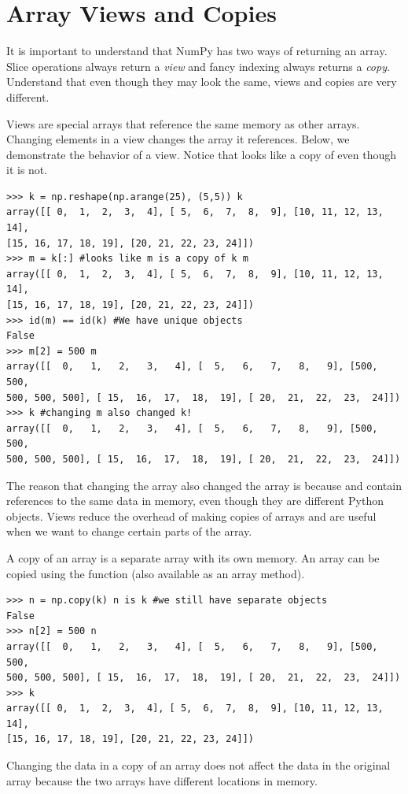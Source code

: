 \section*{Array Views and Copies} It is important to understand that
NumPy has two ways of returning an array. Slice operations always return
a \emph{view} and fancy indexing always returns a \emph{copy}.
Understand that even though they may look the same, views and copies are
very different.

Views are special arrays that reference the same memory as other arrays.
Changing elements in a view changes the array it references. Below, we
demonstrate the behavior of a view. Notice that  looks like a copy
of  even though it is not. \begin{lstlisting}
>>> k = np.reshape(np.arange(25), (5,5)) k
array([[ 0,  1,  2,  3,  4], [ 5,  6,  7,  8,  9], [10, 11, 12, 13, 14],
[15, 16, 17, 18, 19], [20, 21, 22, 23, 24]])
>>> m = k[:] #looks like m is a copy of k m
array([[ 0,  1,  2,  3,  4], [ 5,  6,  7,  8,  9], [10, 11, 12, 13, 14],
[15, 16, 17, 18, 19], [20, 21, 22, 23, 24]])
>>> id(m) == id(k) #We have unique objects
False
>>> m[2] = 500 m
array([[  0,   1,   2,   3,   4], [  5,   6,   7,   8,   9], [500, 500,
500, 500, 500], [ 15,  16,  17,  18,  19], [ 20,  21,  22,  23,  24]])
>>> k #changing m also changed k!
array([[  0,   1,   2,   3,   4], [  5,   6,   7,   8,   9], [500, 500,
500, 500, 500], [ 15,  16,  17,  18,  19], [ 20,  21,  22,  23,  24]])
\end{lstlisting} The reason that changing the array  also changed
the array  is because  and  contain references to the
same data in memory, even though they are different Python objects.
Views reduce the overhead of making copies of arrays and are useful when
we want to change certain parts of the array.

A copy of an array is a separate array with its own memory. An array can
be copied using the  function (also available as an array
method). \begin{lstlisting}
>>> n = np.copy(k) n is k #we still have separate objects
False
>>> n[2] = 500 n
array([[  0,   1,   2,   3,   4], [  5,   6,   7,   8,   9], [500, 500,
500, 500, 500], [ 15,  16,  17,  18,  19], [ 20,  21,  22,  23,  24]])
>>> k
array([[ 0,  1,  2,  3,  4], [ 5,  6,  7,  8,  9], [10, 11, 12, 13, 14],
[15, 16, 17, 18, 19], [20, 21, 22, 23, 24]]) \end{lstlisting} Changing
the data in a copy of an array does not affect the data in the original
array because the two arrays have different locations in memory.

